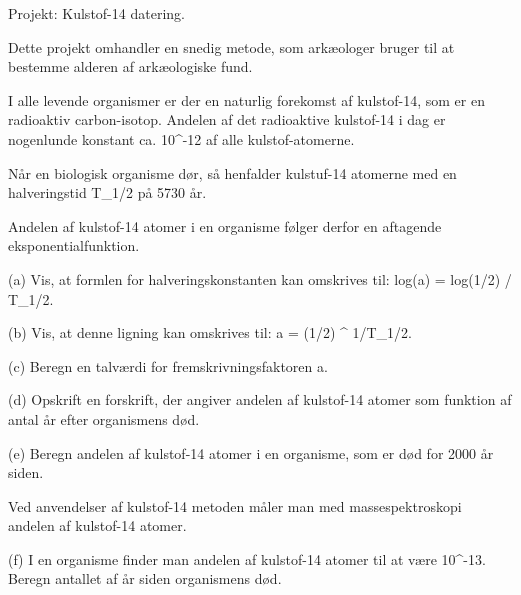 Projekt: Kulstof-14 datering.

Dette projekt omhandler en snedig metode, som arkæologer bruger til at bestemme
alderen af arkæologiske fund.

I alle levende organismer er der en naturlig forekomst af kulstof-14, som er en
radioaktiv carbon-isotop. Andelen af det radioaktive kulstof-14 i dag er
nogenlunde konstant ca. 10^-12 af alle kulstof-atomerne.

Når en biologisk organisme dør, så henfalder kulstuf-14 atomerne med en
halveringstid T_{1/2} på 5730 år.

Andelen af kulstof-14 atomer i en organisme følger derfor en aftagende
eksponentialfunktion.

(a) Vis, at formlen for halveringskonstanten kan omskrives til:
log(a) = log(1/2) / T_{1/2}.

(b) Vis, at denne ligning kan omskrives til:
a = (1/2) ^ {1/T_{1/2}}.

(c) Beregn en talværdi for fremskrivningsfaktoren a.

(d) Opskrift en forskrift, der angiver andelen af kulstof-14 atomer som
funktion af antal år efter organismens død.

(e) Beregn andelen af kulstof-14 atomer i en organisme, som er død for 2000 år
siden.

Ved anvendelser af kulstof-14 metoden måler man med massespektroskopi andelen
af kulstof-14 atomer.

(f) I en organisme finder man andelen af kulstof-14 atomer til at være
10^{-13}. Beregn antallet af år siden organismens død.

